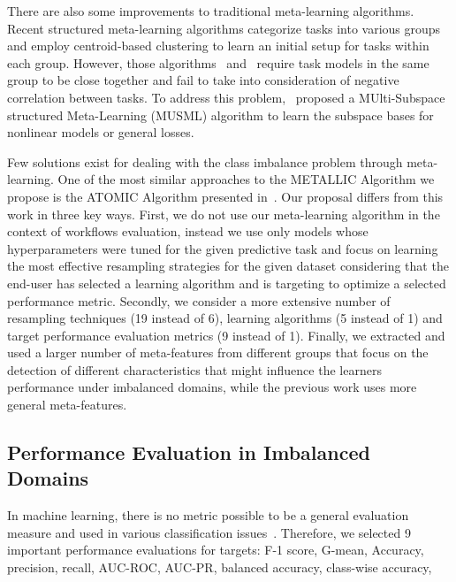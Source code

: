 \documentclass{article}
\begin{document}
There are also some improvements to traditional meta-learning algorithms. Recent structured meta-learning algorithms categorize tasks into various groups and employ centroid-based clustering to learn an initial setup for tasks within each group. However, those algorithms~\textcite{jerfelReconcilingMetalearningContinual2019} and~\textcite{zhouTaskSimilarityAware2021} require task models in the same group to be close together and fail to take into consideration of negative correlation between tasks. To address this problem,~\textcite{jiangMultiSubspaceStructuredMetaLearning2021} proposed a MUlti-Subspace structured Meta-Learning (MUSML) algorithm to learn the subspace bases for nonlinear models or general losses.

Few solutions exist for dealing with the class imbalance problem through meta-learning. One of the most similar approaches to the METALLIC Algorithm we propose is the ATOMIC Algorithm presented in~\cite{monizAutomatedImbalancedClassification2021}. Our proposal differs from this work in three key ways. First, we do not use our meta-learning algorithm in the context of workflows evaluation, instead we use only models whose hyperparameters were tuned for the given predictive task and focus on learning the most effective resampling strategies for the given dataset considering that the end-user has selected a learning algorithm and is targeting to optimize a selected performance metric. Secondly, we consider a more extensive number of resampling techniques (19 instead of 6), learning algorithms (5 instead of 1) and target performance evaluation metrics (9 instead of 1). Finally, we extracted and used a larger number of meta-features from different groups that focus on the detection of different characteristics that might influence the learners performance under imbalanced domains, while the previous work uses more general meta-features.

\subsection{Performance Evaluation in Imbalanced Domains}
In machine learning, there is no metric possible to
be a general evaluation measure and used in various
classification issues~\cite{wardhaniCrossvalidationMetricsEvaluating2019}. Therefore, we selected 9 important performance evaluations for targets: F-1 score, G-mean, Accuracy, precision, recall, AUC-ROC, AUC-PR, balanced accuracy, class-wise accuracy, 
\end{document}
